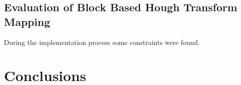\documentclass{article}
\begin{document}
    \subsection{Evaluation of Block Based Hough Transform Mapping}
    During the implementation process some constraints were found.


  \newpage
  \section{Conclusions}

  \newpage
  
  
\end{document}
